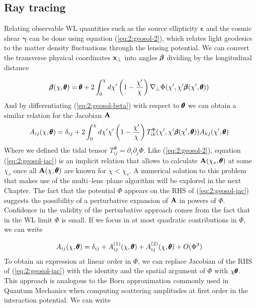 \subsection{Ray tracing}
Relating observable WL quantities such as the source ellipticity $\pmb{\epsilon}$ and the cosmic shear $\pmb{\gamma}$ can be done using equation (\ref{eq:2:geosol-2}), which relates light geodesics to the matter density fluctuations through the lensing potential. We can convert the transverse physical coordinates $\mathbf{x}_\perp$ into angles $\pmb{\beta}$ dividing by the longitudinal distance

\begin{equation}
\label{eq:2:geosol-beta}
\pmb{\beta}(\chi,\pmb{\theta}) = \pmb{\theta} + 2\int_0^\chi d\chi'\left(1-\frac{\chi'}{\chi}\right)\nabla_\perp\Phi(\chi',\chi'\pmb{\beta}(\chi',\pmb{\theta}))
\end{equation}
%
And by differentiating (\ref{eq:2:geosol-beta}) with respect to $\pmb{\theta}$ we can obtain a similar relation for the Jacobian $\mathbf{A}$
\begin{equation}
\label{eq:2:geosol-jac}
A_{ij}(\chi,\pmb{\theta}) = \delta_{ij} + 2\int_0^\chi d\chi'\chi'\left(1-\frac{\chi'}{\chi}\right)T^{\Phi}_{ik}(\chi',\chi'\pmb{\beta}(\chi',\pmb{\theta}))A_{kj}(\chi',\pmb{\theta})
\end{equation}
%
Where we defined the tidal tensor $T^{\Phi}_{ij}=\partial_i\partial_j\Phi$. Like (\ref{eq:2:geosol-2}), equation (\ref{eq:2:geosol-jac}) is an implicit relation that allows to calculate $\mathbf{A}(\chi_s,\pmb{\theta})$ at some $\chi_s$ once all $\mathbf{A}(\chi,\pmb{\theta})$ are known for $\chi<\chi_s$. A numerical solution to this problem that makes use of the multi--lens--plane algorithm \citep{RayTracingJain,RayTracingHartlap} will be explored in the next Chapter. 
The fact that the potential $\Phi$ appears on the RHS of (\ref{eq:2:geosol-jac}) suggests the possibility of a perturbative expansion of $\mathbf{A}$ in powers of $\Phi$. Confidence in the validity of the perturbative approach comes from the fact that in the WL limit $\Phi$ is small. If we focus in at most quadratic contributions in $\Phi$, we can write

\begin{equation}
\label{eq:2:jacobian-pert}
A_{ij}(\chi,\pmb{\theta}) = \delta_{ij} + A_{ij}^{(1)}(\chi,\pmb{\theta}) + A_{ij}^{(2)}(\chi,\pmb{\theta}) + O(\Phi^3)
\end{equation}
%
To obtain an expression at linear order in $\Phi$, we can replace Jacobian of the RHS of (\ref{eq:2:geosol-jac}) with the identity and the spatial argument of $\Phi$ with $\chi\pmb{\theta}$. This approach is analogous to the Born approximation commonly used in Quantum Mechanics when computing scattering amplitudes at first order in the interaction potential. We can write

